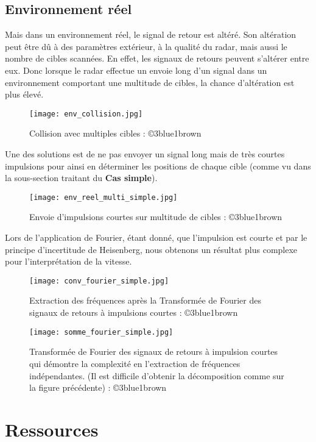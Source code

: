 \documentclass[a4paper]{book}
\begin{document}
\subsection{Environnement réel}
Mais dans un environnement réel, le signal de retour est altéré. Son altération
peut être dû à des paramètres extérieur, à la qualité du radar, mais aussi le
nombre de cibles scannées. En effet, les signaux de retours peuvent s'altérer
entre eux. Donc lorsque le radar effectue un envoie long d'un signal dans un
environnement comportant une multitude de cibles, la chance d'altération est 
plus élevé.
\begin{figure}[hbt!]
	\centering
	\texttt{[image: env\_collision.jpg]}
	\caption{Collision avec multiples cibles
	: ©3blue1brown }
\end{figure}
Une des solutions est de ne pas envoyer un signal long mais de très courtes
impulsions pour ainsi en déterminer les positions de chaque cible (comme vu dans
la sous-section traitant du \textbf{Cas simple}).
\begin{figure}[hbt!]
	\centering
	\texttt{[image: env\_reel\_multi\_simple.jpg]}
	\caption{Envoie d'impulsions courtes sur multitude de cibles
	: ©3blue1brown }
\end{figure}
Lors de l'application de Fourier, étant donné, que l'impulsion est courte et par
le principe d'incertitude de Heisenberg, nous obtenons un résultat plus complexe pour
l'interprétation de la vitesse.
\begin{figure}[hbt!]
	\centering
	\texttt{[image: conv\_fourier\_simple.jpg]}
	\caption{Extraction des fréquences après la Transformée de Fourier des
	signaux de retours à impulsions courtes
	: ©3blue1brown }
\end{figure}

\begin{figure}[hbt!]
	\centering
	\texttt{[image: somme\_fourier\_simple.jpg]}
	\caption{Transformée de Fourier des signaux de retours à impulsion
	courtes qui démontre la complexité en l'extraction de fréquences
	indépendantes. (Il est difficile d'obtenir la décomposition comme sur la
	figure précédente)
	: ©3blue1brown }
\end{figure}




\section{Ressources}
\end{document}
